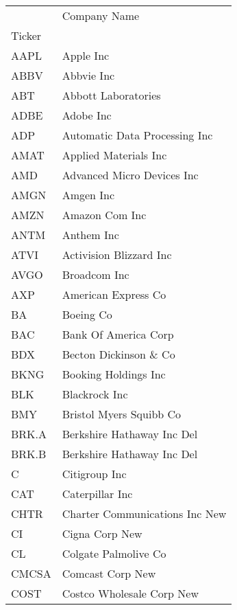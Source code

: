\begin{tabular}{ll}
\toprule
{} &                      Company Name \\
Ticker &                                   \\
\midrule
AAPL   &                         Apple Inc \\
ABBV   &                        Abbvie Inc \\
ABT    &               Abbott Laboratories \\
ADBE   &                         Adobe Inc \\
ADP    &     Automatic Data Processing Inc \\
AMAT   &             Applied Materials Inc \\
AMD    &        Advanced Micro Devices Inc \\
AMGN   &                         Amgen Inc \\
AMZN   &                    Amazon Com Inc \\
ANTM   &                        Anthem Inc \\
ATVI   &           Activision Blizzard Inc \\
AVGO   &                      Broadcom Inc \\
AXP    &               American Express Co \\
BA     &                         Boeing Co \\
BAC    &              Bank Of America Corp \\
BDX    &            Becton Dickinson \& Co \\
BKNG   &              Booking Holdings Inc \\
BLK    &                     Blackrock Inc \\
BMY    &           Bristol Myers Squibb Co \\
BRK.A  &        Berkshire Hathaway Inc Del \\
BRK.B  &        Berkshire Hathaway Inc Del \\
C      &                     Citigroup Inc \\
CAT    &                   Caterpillar Inc \\
CHTR   &    Charter Communications Inc New \\
CI     &                    Cigna Corp New \\
CL     &              Colgate Palmolive Co \\
CMCSA  &                  Comcast Corp New \\
COST   &         Costco Wholesale Corp New \\

\end{tabular}
